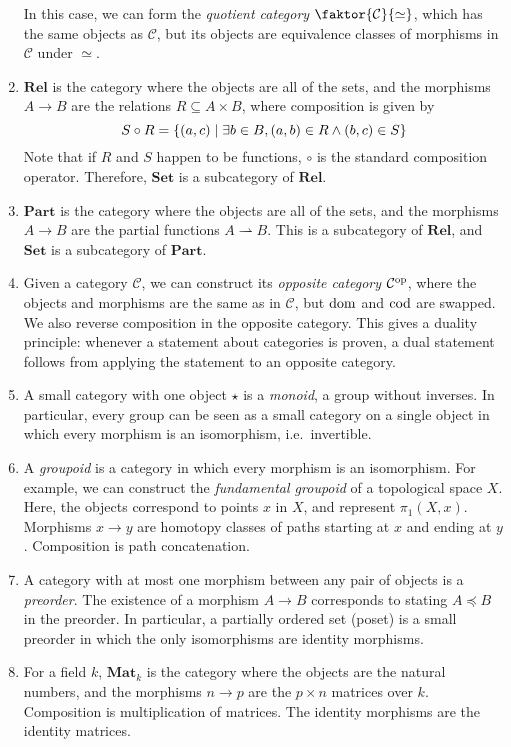 \begin{example}
\begin{enumerate}
        In this case, we can form the \emph{quotient category} \( \faktor{\mathcal C}{\simeq} \), which has the same objects as \( \mathcal C \), but its objects are equivalence classes of morphisms in \( \mathcal C \) under \( \simeq \).
        \item \( \mathbf{Rel} \) is the category where the objects are all of the sets, and the morphisms \( A \to B \) are the relations \( R \subseteq A \times B \), where composition is given by
        \[ S \circ R = \qty{(a, c) \mid \exists b \in B, (a, b) \in R \wedge (b, c) \in S} \]
        Note that if \( R \) and \( S \) happen to be functions, \( \circ \) is the standard composition operator.
        Therefore, \( \mathbf{Set} \) is a subcategory of \( \mathbf{Rel} \).
        \item \( \mathbf{Part} \) is the category where the objects are all of the sets, and the morphisms \( A \to B \) are the partial functions \( A \rightharpoonup B \).
        This is a subcategory of \( \mathbf{Rel} \), and \( \mathbf{Set} \) is a subcategory of \( \mathbf{Part} \).
        \item Given a category \( \mathcal C \), we can construct its \emph{opposite category} \( \mathcal C^{\mathrm{op}} \), where the objects and morphisms are the same as in \( \mathcal C \), but \( \operatorname{dom} \) and \( \operatorname{cod} \) are swapped.
        We also reverse composition in the opposite category.
        This gives a duality principle: whenever a statement about categories is proven, a dual statement follows from applying the statement to an opposite category.
        \item A small category with one object \( \star \) is a \emph{monoid}, a group without inverses.
        In particular, every group can be seen as a small category on a single object in which every morphism is an isomorphism, i.e.\ invertible.
        \item A \emph{groupoid} is a category in which every morphism is an isomorphism.
        For example, we can construct the \emph{fundamental groupoid} of a topological space \( X \).
        Here, the objects correspond to points \( x \) in \( X \), and represent \( \pi_1(X, x) \).
        Morphisms \( x \to y \) are homotopy classes of paths starting at \( x \) and ending at \( y \).
        Composition is path concatenation.
        \item A category with at most one morphism between any pair of objects is a \emph{preorder}.
        The existence of a morphism \( A \to B \) corresponds to stating \( A \preceq B \) in the preorder.
        In particular, a partially ordered set (poset) is a small preorder in which the only isomorphisms are identity morphisms.
        \item For a field \( k \), \( \mathbf{Mat}_k \) is the category where the objects are the natural numbers, and the morphisms \( n \to p \) are the \( p \times n \) matrices over \( k \).
        Composition is multiplication of matrices.
        The identity morphisms are the identity matrices.
    \end{enumerate}
\end{example}

